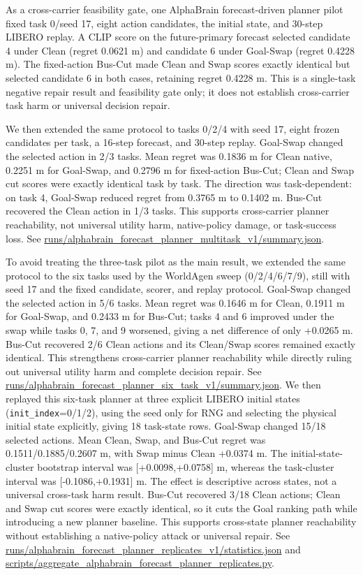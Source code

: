 \documentclass[10pt]{article}
\begin{document}
As a cross-carrier feasibility gate, one AlphaBrain forecast-driven planner pilot fixed task 0/seed 17, eight action candidates, the initial state, and 30-step LIBERO replay. A CLIP score on the future-primary forecast selected candidate 4 under Clean (regret 0.0621 m) and candidate 6 under Goal-Swap (regret 0.4228 m). The fixed-action Bus-Cut made Clean and Swap scores exactly identical but selected candidate 6 in both cases, retaining regret 0.4228 m. This is a single-task negative repair result and feasibility gate only; it does not establish cross-carrier task harm or universal decision repair.

We then extended the same protocol to tasks 0/2/4 with seed 17, eight frozen candidates per task, a 16-step forecast, and 30-step replay. Goal-Swap changed the selected action in 2/3 tasks. Mean regret was 0.1836 m for Clean native, 0.2251 m for Goal-Swap, and 0.2796 m for fixed-action Bus-Cut; Clean and Swap cut scores were exactly identical task by task. The direction was task-dependent: on task 4, Goal-Swap reduced regret from 0.3765 m to 0.1402 m. Bus-Cut recovered the Clean action in 1/3 tasks. This supports cross-carrier planner reachability, not universal utility harm, native-policy damage, or task-success loss. See \url{runs/alphabrain_forecast_planner_multitask_v1/summary.json}.

To avoid treating the three-task pilot as the main result, we extended the same protocol to the six tasks used by the WorldAgen sweep (0/2/4/6/7/9), still with seed 17 and the fixed candidate, scorer, and replay protocol. Goal-Swap changed the selected action in 5/6 tasks. Mean regret was 0.1646 m for Clean, 0.1911 m for Goal-Swap, and 0.2433 m for Bus-Cut; tasks 4 and 6 improved under the swap while tasks 0, 7, and 9 worsened, giving a net difference of only +0.0265 m. Bus-Cut recovered 2/6 Clean actions and its Clean/Swap scores remained exactly identical. This strengthens cross-carrier planner reachability while directly ruling out universal utility harm and complete decision repair. See \url{runs/alphabrain_forecast_planner_six_task_v1/summary.json}.
We then replayed this six-task planner at three explicit LIBERO initial states (\texttt{init\_index}=0/1/2), using the seed only for RNG and selecting the physical initial state explicitly, giving 18 task-state rows. Goal-Swap changed 15/18 selected actions. Mean Clean, Swap, and Bus-Cut regret was 0.1511/0.1885/0.2607 m, with Swap minus Clean +0.0374 m. The initial-state-cluster bootstrap interval was [+0.0098,+0.0758] m, whereas the task-cluster interval was [-0.1086,+0.1931] m. The effect is descriptive across states, not a universal cross-task harm result. Bus-Cut recovered 3/18 Clean actions; Clean and Swap cut scores were exactly identical, so it cuts the Goal ranking path while introducing a new planner baseline. This supports cross-state planner reachability without establishing a native-policy attack or universal repair. See \url{runs/alphabrain_forecast_planner_replicates_v1/statistics.json} and \url{scripts/aggregate_alphabrain_forecast_planner_replicates.py}.
\end{document}
